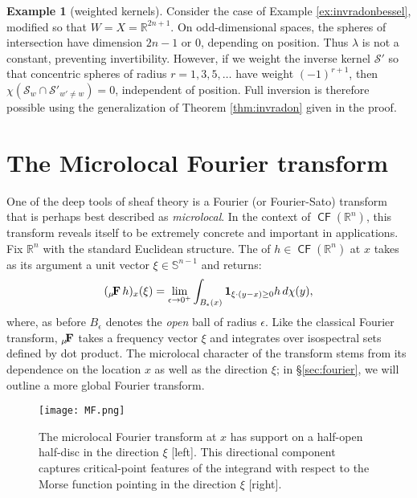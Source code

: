 \documentclass{psapm-l}
\theoremstyle{definition}
\newtheorem{example}[theorem]{Example}
\theoremstyle{remark}
\numberwithin{equation}{section}
\begin{document}
\begin{example}[weighted kernels]
\label{ex:invradonweighted}
Consider the case of Example \ref{ex:invradonbessel}, modified so that $W=X={{\mathbb R}}^{2n+1}$. On odd-dimensional spaces, the spheres of intersection have dimension $2n-1$ or $0$, depending on position. Thus $\lambda$ is not a constant, preventing invertibility. However, if we weight the inverse kernel ${{\mathcal S}}'$ so that concentric spheres of radius $r=1,3,5,\ldots$ have weight $(-1)^{r+1}$, then $\chi({{\mathcal S}}_w\cap{{\mathcal S}}'_{w'\neq w})=0$, independent of position. Full inversion is therefore possible using the generalization of Theorem \ref{thm:invradon} given in the proof.
\end{example}

\section{The Microlocal Fourier transform}
\label{sec:MF}

One of the deep tools of sheaf theory is a Fourier (or Fourier-Sato) transform \cite{KS} that is perhaps best described as {\em microlocal}.  In the context of ${{{\operatorname{\mathsf{{CF}}}}}}({{\mathbb R}}^n)$, this transform reveals itself to be extremely concrete and important in applications. Fix ${{\mathbb R}}^n$ with the standard Euclidean structure. The {{}} of $h\in{{{\operatorname{\mathsf{{CF}}}}}}({{\mathbb R}}^n)$ at $x$ takes as its argument a unit vector $\xi\in{{\mathbb S}}^{n-1}$ and returns:
\begin{equation}
    ({{\bf _\mu\! F}}\,h)_x(\xi) = \lim_{\epsilon\to 0^+}\int_{B_\epsilon(x)}{{\mathbf{1}}}_{\xi\cdot (y-x)\geq 0}h\,d\chi(y) ,
\end{equation}
where, as before $B_\epsilon$ denotes the {\em open} ball of radius $\epsilon$. Like the classical Fourier transform, ${{\bf _\mu\! F}}$ takes a frequency vector $\xi$ and integrates over isospectral sets defined by dot product. The microlocal character of the transform stems from its dependence on the location $x$ as well as the direction $\xi$; in \S\ref{sec:fourier}, we will outline a more global Fourier transform.
\begin{figure}[hbt]
\begin{center}
\texttt{[image: MF.png]}
\caption{The microlocal Fourier transform at $x$ has support on a half-open half-disc in the direction $\xi$ [left]. This directional component captures critical-point features of the integrand with respect to the Morse function pointing in the direction $\xi$ [right].}
\label{fig:MF}
\end{center}
\end{figure}
\end{document}
